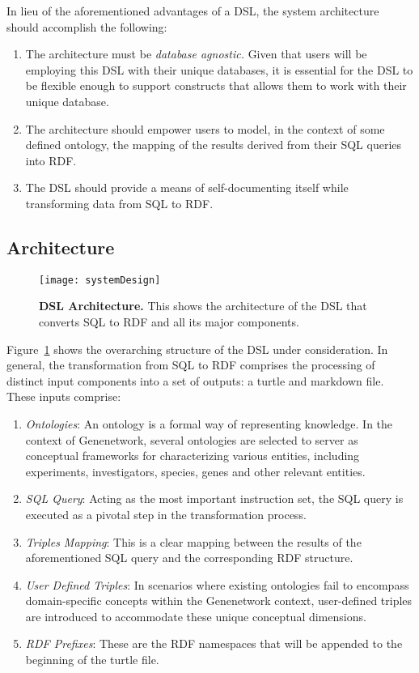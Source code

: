 In lieu of the aforementioned advantages of a DSL, the system architecture should accomplish the following:

\begin{enumerate}
\item The architecture must be \textit{database agnostic.}  Given that users will be employing this DSL with their unique databases, it is essential for the DSL to be flexible enough to support constructs that allows them to work with their unique database.
\item The architecture should empower users to model, in the context of some defined ontology, the mapping of the results derived from their SQL queries into RDF\@.
\item The DSL should provide a means of self-documenting itself while transforming data from SQL to RDF\@.
\end{enumerate}

\subsection{Architecture}
\begin{figure}[H]
  \centering
  \texttt{[image: systemDesign]}
  \caption[DSL Architecture]{\textbf{DSL Architecture.}  This shows the architecture of the DSL that converts SQL to RDF and all its major components.}\label{fig:system-diagram}
  \centering
\end{figure}

Figure~\ref{fig:system-diagram} shows the overarching structure of the DSL under consideration.  In general, the transformation from SQL to RDF comprises the processing of distinct input components into a set of outputs: a turtle and markdown file.  These inputs comprise:

\begin{enumerate}
\item \textit{Ontologies}: An ontology is a formal way of representing knowledge.  In the context of Genenetwork, several ontologies are selected to server as conceptual frameworks for characterizing various entities, including experiments, investigators, species, genes and other relevant entities.
\item \textit{SQL Query}: Acting as the most important instruction set, the SQL query is executed as a pivotal step in the transformation process.
\item \textit{Triples Mapping}: This is a clear mapping between the results of the aforementioned SQL query and the corresponding RDF structure.
\item \textit{User Defined Triples}: In scenarios where existing ontologies fail to encompass domain-specific concepts within the Genenetwork context, user-defined triples are introduced to accommodate these unique conceptual dimensions.
\item \textit{RDF Prefixes}: These are the RDF namespaces that will be appended to the beginning of the turtle file.
\end{enumerate}

